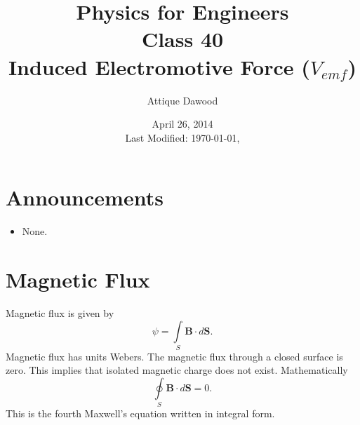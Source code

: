 \documentclass[12pt,a4paper]{article}
\title{\vspace{-3cm}Physics for Engineers\\Class 40\\Induced Electromotive Force ($V_{emf}$)}
\author{Attique Dawood}
\date{April 26, 2014\\[0.2cm] Last Modified: \today, \currenttime}
\begin{document}
\maketitle
\section{Announcements}
\begin{itemize}
\item None.
\end{itemize}
\section{Magnetic Flux}
Magnetic flux is given by
\begin{equation}
\psi=\int\limits_{S}\textbf{B}\cdot d{\textbf{S}}.
\end{equation}
Magnetic flux has units Webers. The magnetic flux through a closed surface is zero. This implies that isolated magnetic charge does not exist. Mathematically
\begin{equation}
\oint\limits_{S}\textbf{B}\cdot d{\textbf{S}}=0.
\end{equation}
This is the fourth Maxwell's equation written in integral form.
\end{document}
